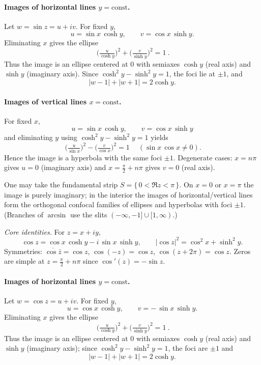 \begin{problem}[CP-IV-0137]
\medskip
\paragraph{Images of horizontal lines $y=\text{const}$.}
Let $w=\sin z=u+iv$. For fixed $y$,
\[
u=\sin x\,\cosh y,\qquad v=\cos x\,\sinh y.
\]
Eliminating $x$ gives the ellipse
\[
\boxed{\ \Big(\tfrac{u}{\cosh y}\Big)^{2}+\Big(\tfrac{v}{\sinh y}\Big)^{2}=1\ }.
\]
Thus the image is an ellipse centered at $0$ with semiaxes $\cosh y$ (real axis) and $\sinh y$ (imaginary axis).
Since $\cosh^{2}y-\sinh^{2}y=1$, the foci lie at $\pm1$, and
\[
|w-1|+|w+1|=2\cosh y.
\]

\medskip
\paragraph{Images of vertical lines $x=\text{const}$.}
For fixed $x$,
\[
u=\sin x\,\cosh y,\qquad v=\cos x\,\sinh y
\]
and eliminating $y$ using $\cosh^{2}y-\sinh^{2}y=1$ yields
\[
\boxed{\ \Big(\tfrac{u}{\sin x}\Big)^{2}-\Big(\tfrac{v}{\cos x}\Big)^{2}=1\ } \quad
(\sin x\,\cos x\ne0).
\]
Hence the image is a hyperbola with the same foci $\pm1$.
Degenerate cases:
$x=n\pi$ gives $u=0$ (imaginary axis) and $x=\frac{\pi}{2}+n\pi$ gives $v=0$ (real axis).

\medskip

One may take the fundamental strip $S=\{\,0<\Re z<\pi\,\}$. On $x=0$ or $x=\pi$
the image is purely imaginary; in the interior the images of horizontal/vertical lines
form the orthogonal confocal families of ellipses and hyperbolas with foci $\pm1$.
(Branches of $\arcsin$ use the slits $(-\infty,-1]\cup[1,\infty)$.)

\emph{Core identities.} For $z=x+iy$,
\[
\cos z=\cos x\,\cosh y - i\,\sin x\,\sinh y,\qquad
|\cos z|^{2}=\cos^{2}x+\sinh^{2}y.
\]
Symmetries: $\overline{\cos\bar z}=\cos z$, $\cos(-z)=\cos z$, $\cos(z+2\pi)=\cos z$.
Zeros are simple at $z=\tfrac{\pi}{2}+n\pi$ since $\cos'(z)=-\sin z$.

\medskip
\paragraph{Images of horizontal lines $y=\text{const}$.}
Let $w=\cos z=u+iv$. For fixed $y$,
\[
u=\cos x\,\cosh y,\qquad v=-\,\sin x\,\sinh y.
\]
Eliminating $x$ gives the ellipse
\[
\boxed{\ \Big(\tfrac{u}{\cosh y}\Big)^{2}+\Big(\tfrac{v}{\sinh y}\Big)^{2}=1\ }.
\]
Thus the image is an ellipse centered at $0$ with semiaxes $\cosh y$ (real axis) and $\sinh y$ (imaginary axis); since $\cosh^{2}y-\sinh^{2}y=1$, the foci are $\pm1$ and
\[
|w-1|+|w+1|=2\cosh y.
\]


\end{problem}
